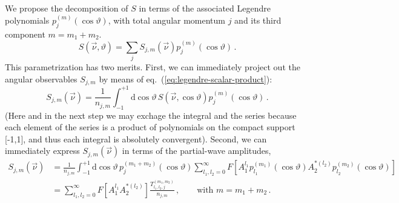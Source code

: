 \documentclass[aps,prd,reprint,nofootinbib,preprintnumbers]{revtex4}
\newcommand{\refeq}[1]{eq.~(\ref{eq:#1})}
\newcommand{\rmdx}[1]{\mbox{d} #1 \,} %
\renewcommand{\theta}{\vartheta}
\begin{document}
We propose the decomposition of $S$ in terms of the associated Legendre polynomials $p_{j}^{(m)}(\cos\theta)$, with total angular momentum $j$ and its third component $m=m_1 + m_2$.
\begin{equation}
    S(\vec{\nu}, \theta) = \sum_j S_{j,m}(\vec{\nu}) p_{j}^{(m)}(\cos\theta)\,.
\end{equation}
This parametrization has two merits. First, we can immediately project out the angular observables $S_{j,m}$ by means of \refeq{legendre-scalar-product}:
\begin{equation}
    S_{j,m}(\vec{\nu}) = \frac{1}{n_{j,m}} \int_{-1}^{+1} \rmdx{\cos\theta} S(\vec{\nu},\cos \theta) p_{j}^{(m)}(\cos\theta)\,.
\end{equation}
(Here and in the next step we may exchage the integral and the
series because each element of the series is a product of
polynomials on the compact support [-1,1], and thus each integral
is absolutely convergent).
Second, we can immediately express $S_{j,m}(\vec{\nu})$ in terms of
the partial-wave amplitudes,
\begin{equation}
    \label{eq:partial-wave-observable-infinite}
    \begin{aligned}
        S_{j,m}(\vec{\nu})
            & = \frac{1}{n_{j,m}} \int_{-1}^{+1} \rmdx{\cos\theta} p_{j}^{(m_1 + m_2)}(\cos\theta) \sum_{l_1,l_2=0}^\infty F\left[A_{1}^{l_1} p_{l_1}^{(m_1)}(\cos\theta) A_{2}^{*(l_2)}p_{l_2}^{(m_2)}(\cos\theta)\right]\\
            & = \sum_{l_1,l_2=0}^\infty F\left[A_{1}^{l_1} A_{2}^{*(l_2)}\right] \frac{T_{l_1,l_2,j}^{(m_1,m_2)}}{n_{j,m}}\,,\qquad\text{with }m = m_1 + m_2\,.
    \end{aligned}
\end{equation}
\end{document}
